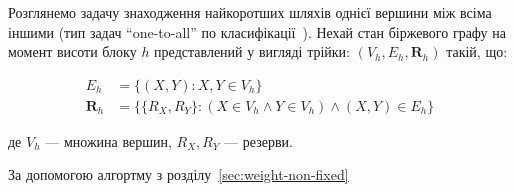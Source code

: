 \documentclass[../index.tex]{subfiles}
\begin{document}
Розглянемо задачу знаходження найкоротших шляхів однієї вершини між всіма іншими
(тип задач ``one-to-all'' по класифікації~\cite{deo1980shortest}). Нехай стан
біржевого графу на момент висоти блоку $h$ представлений у вигляді трійки:
$(V_{h}, E_{h}, \mathbf{R}_{h})$ такій, що:

\begin{equation}
  \begin{aligned}
    E_{h} &= \{(X, Y): X, Y \in V_{h}\}\\
    \mathbf{R}_{h} &= \{ \{R_{X}, R_{Y}\}: (X \in V_{h} \land Y \in V_{h}) \land (X, Y) \in E_{h} \}
  \end{aligned}
\end{equation}

де $V_{h}$ --- множина вершин, $R_{X}, R_{Y}$ --- резерви.

За допомогою алгортму з розділу~\ref{sec:weight-non-fixed}
\end{document}
